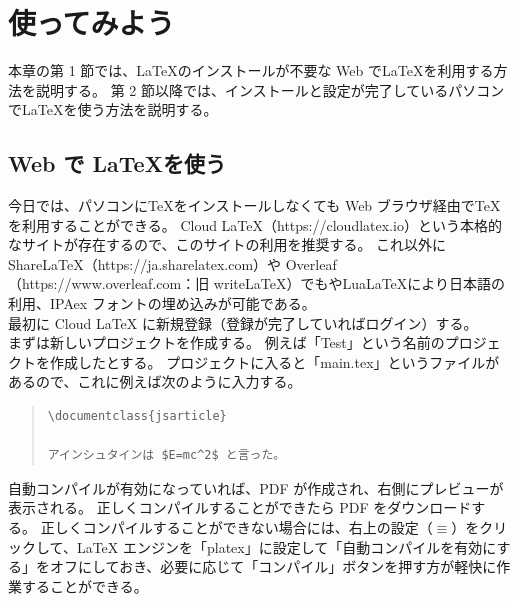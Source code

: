 \chapter{使ってみよう}
本章の第 1 節では、\LaTeX{}のインストールが不要な Web で\LaTeX{}を利用する方法を説明する。
第 2 節以降では、インストールと設定が完了しているパソコンで\LaTeX{}を使う方法を説明する。
\section{Web で \LaTeX{}を使う}
今日では、パソコンに\TeX{}をインストールしなくても Web ブラウザ経由で\TeX{}を利用することができる。
Cloud LaTeX（https://cloudlatex.io）という本格的なサイトが存在するので、このサイトの利用を推奨する。
これ以外に ShareLaTeX（https://ja.sharelatex.com）や Overleaf（https://www.overleaf.com：旧 writeLaTeX）でも\XeLaTeX{}やLua\LaTeX{}により日本語の利用、IPAex フォントの埋め込みが可能である。\\

最初に Cloud LaTeX に新規登録（登録が完了していればログイン）する。\\

まずは新しいプロジェクトを作成する。
例えば「Test」という名前のプロジェクトを作成したとする。
プロジェクトに入ると「main.tex」というファイルがあるので、これに例えば次のように入力する。
\begin{quote}
\begin{verbatim}
\documentclass{jsarticle}

アインシュタインは $E=mc^2$ と言った。

\end{verbatim}
\end{quote}
\vspc{-5.00pt}\begin{figure}[H]\centering{}\end{figure}\vspc{-5.00pt}
自動コンパイルが有効になっていれば、PDF が作成され、右側にプレビューが表示される。
正しくコンパイルすることができたら PDF をダウンロードする。
正しくコンパイルすることができない場合には、右上の設定（$\equiv$）をクリックして、LaTeX エンジンを「platex」に設定して「自動コンパイルを有効にする」をオフにしておき、必要に応じて「コンパイル」ボタンを押す方が軽快に作業することができる。
